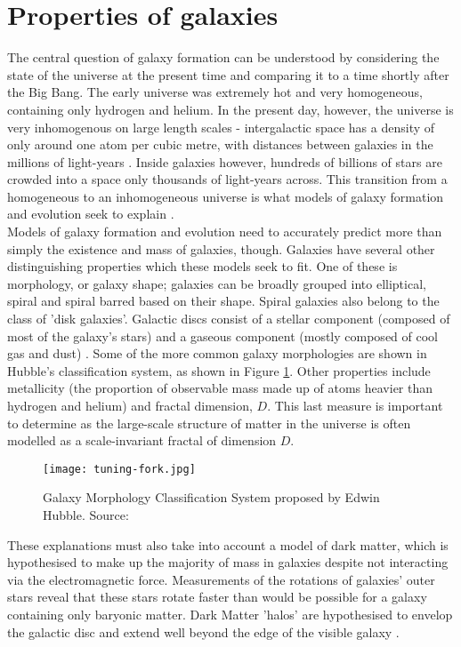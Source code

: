 \documentclass[amsmath,amssymb,reprint,
tightenlines,aps,prl,11pt]{revtex4-1}
\begin{document}
\section{Properties of galaxies}
The central question of galaxy formation can be understood by considering the state of the universe at the present time and comparing it to a time shortly after the Big Bang. The early universe was extremely hot and very homogeneous, containing only hydrogen and helium. In the present day, however, the universe is very inhomogenous on large length scales - intergalactic space has a density of only around one atom per cubic metre, with distances between galaxies in the millions of light-years \cite{BigBangModel2019}. Inside galaxies however, hundreds of billions of stars are crowded into a space only thousands of light-years across. This transition from a homogeneous to an inhomogeneous universe is what models of galaxy formation and evolution seek to explain \cite{FormationGalaxies2019}. \\

Models of galaxy formation and evolution need to accurately predict more than simply the existence and mass of galaxies, though. Galaxies have several other distinguishing properties which these models seek to fit. One of these is morphology, or galaxy shape; galaxies can be broadly grouped into elliptical, spiral and spiral barred based on their shape. Spiral galaxies also belong to the class of 'disk galaxies'. Galactic discs consist of a stellar component (composed of most of the galaxy's stars) and a gaseous component (mostly composed of cool gas and dust)  \cite{FormationGalaxies2019}. Some of the more common galaxy morphologies are shown in Hubble's classification system, as shown in Figure \ref{fig:tuning-fork}. Other properties include metallicity (the proportion of observable mass made up of atoms heavier than hydrogen and helium) and fractal dimension, $D$. This last measure is important to determine as the large-scale structure of matter in the universe is often modelled as a scale-invariant fractal of dimension $D$. \\

\begin{figure} \centering
\texttt{[image: tuning-fork.jpg]}
\caption{Galaxy Morphology Classification System proposed by Edwin Hubble. Source: \cite{HubbleTuningFork}}
\label{fig:tuning-fork}
\end{figure}

These explanations must also take into account a model of dark matter, which is hypothesised to make up the majority of mass in galaxies despite not interacting via the electromagnetic force. Measurements of the rotations of galaxies' outer stars reveal that these stars rotate faster than would be possible for a galaxy containing only baryonic matter. Dark Matter 'halos' are hypothesised to envelop the galactic disc and extend well beyond the edge of the visible galaxy \cite{GalaxyEvolutionGalaxies}.
\end{document}
